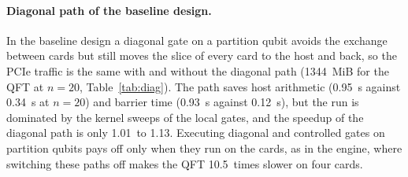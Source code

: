 \documentclass[pdflatex,sn-mathphys-num]{sn-jnl}
\newcommand{\NumAblQftFourAllOff}{10.5}
\newcommand{\NumDiagBarrierOffTwenty}{0.93}
\newcommand{\NumDiagBarrierOnTwenty}{0.12}
\newcommand{\NumDiagHostOffTwenty}{0.95}
\newcommand{\NumDiagHostOnTwenty}{0.34}
\newcommand{\NumDiagPcieTwenty}{1344}
\newcommand{\NumDiagSpeedupMax}{1.13}
\newcommand{\NumDiagSpeedupMin}{1.01}
\theoremstyle{thmstyleone}
\theoremstyle{thmstylethree}
\begin{document}
\paragraph{Diagonal path of the baseline design.} In the baseline design a diagonal gate on a partition qubit avoids
the exchange between cards but still moves the slice of every card to the host and back, so the PCIe traffic is the
same with and without the diagonal path (\NumDiagPcieTwenty~MiB for the QFT at $n=20$, Table~\ref{tab:diag}). The path
saves host arithmetic (\NumDiagHostOffTwenty~s against \NumDiagHostOnTwenty~s at $n=20$) and barrier time
(\NumDiagBarrierOffTwenty~s against \NumDiagBarrierOnTwenty~s), but the run is dominated by the kernel sweeps of the local
gates, and the speedup of the diagonal path is only \NumDiagSpeedupMin~to \NumDiagSpeedupMax. Executing diagonal and
controlled gates on partition qubits pays off only when they run on the cards, as in the engine, where switching these
paths off makes the QFT \NumAblQftFourAllOff~times slower on four cards.
\end{document}
